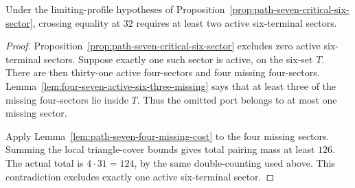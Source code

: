 \begin{corollary}
\label{cor:path-seven-critical-two-six-sectors}
Under the limiting-profile hypotheses of Proposition~\ref{prop:path-seven-critical-six-sector}, crossing equality at $32$ requires at least two active six-terminal sectors.
\end{corollary}

\begin{proof}
Proposition~\ref{prop:path-seven-critical-six-sector} excludes zero active six-terminal sectors.
Suppose exactly one such sector is active, on the six-set $T$.
There are then thirty-one active four-sectors and four missing four-sectors.
Lemma~\ref{lem:four-seven-active-six-three-missing} says that at least three of the missing four-sectors lie inside $T$.
Thus the omitted port belongs to at most one missing sector.

Apply Lemma~\ref{lem:path-seven-four-missing-cost} to the four missing sectors.
Summing the local triangle-cover bounds gives total pairing mass at least $126$.
The actual total is $4\cdot31=124$, by the same double-counting used above.
This contradiction excludes exactly one active six-terminal sector.
\end{proof}
